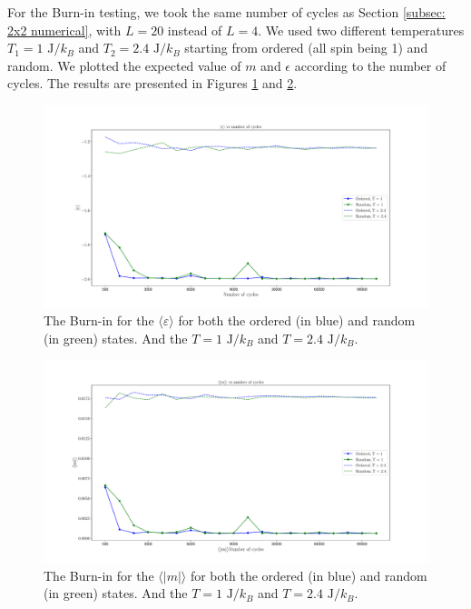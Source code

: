 \documentclass[english,notitlepage,reprint,nofootinbib]{revtex4-2}  %
\begin{document}
	For the Burn-in testing, we took the same number of cycles as Section \ref{subsec: 2x2 numerical},
	with $L=20$ instead of $L=4$. We used two different temperatures $T_1=1 \text{ J}/k_{B}$ and $T_2=2.4 \text{ J}/k_{B}$
	starting from ordered (all spin being 1) and random. We plotted the expected value of $m$ and $\epsilon$ according to the number of cycles. The results are presented in
	Figures \ref{fig:eps5} and \ref{fig:m5}.

	\begin{figure}[h!]
		\centering
		\includegraphics[scale=0.55]{figures/epsilon_problem5.pdf}
		\caption{The Burn-in for the $\langle \varepsilon \rangle$ for both the ordered (in blue) and random (in green) states. And the $T=1 \text{ J}/k_{B}$ and $T=2.4 \text{ J}/k_{B}$.}
		\label{fig:eps5}
	\end{figure}
	\begin{figure}[h!]
		\centering
		\includegraphics[scale=0.55]{figures/m_problem5.pdf}
		\caption{The Burn-in for the $\langle |m| \rangle$ for both the ordered (in blue) and random (in green) states. And the $T=1 \text{ J}/k_{B}$ and $T=2.4 \text{ J}/k_{B}$.}
		\label{fig:m5}
	\end{figure}
\end{document}
